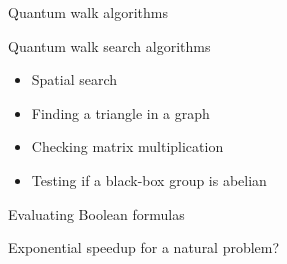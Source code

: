 
\begin{frame}{Quantum walk algorithms}

Quantum walk search algorithms
\begin{itemize}
  \item Spatial search
  \item Finding a triangle in a graph
  \item Checking matrix multiplication
  \item Testing if a black-box group is abelian
\end{itemize}

\bigskip

Evaluating Boolean formulas

\bigskip

Exponential speedup for a natural problem?

\end{frame}